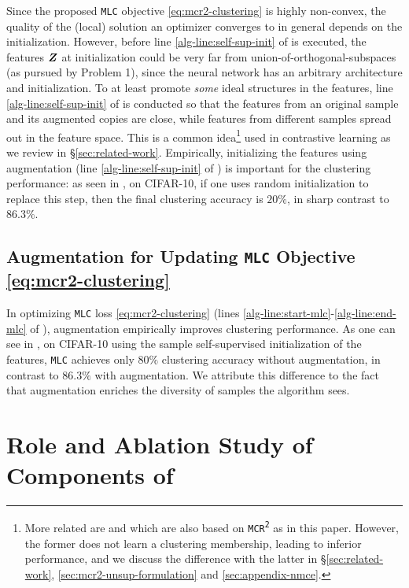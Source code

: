 \documentclass[10pt,twocolumn,letterpaper]{article}
\newcommand{\ours}{MLC}
\newcommand{\mours}{\texttt{\ours}}
\newcommand{\mcr}{\texttt{MCR\textsuperscript{2}}}
\begin{document}
   Since the proposed \mours{} objective \eqref{eq:mcr2-clustering} is highly non-convex, the quality of the (local) solution an optimizer converges to in general depends on the initialization. However, before line \ref{alg-line:self-sup-init} of  is executed, the features ${\bm{Z}}$ at initialization could be very far from union-of-orthogonal-subspaces (as pursued by Problem 1), since the neural network has an arbitrary architecture and initialization. To at least promote \textit{some} ideal structures in the features, line \ref{alg-line:self-sup-init} of  is conducted so that the features from an original sample and its augmented copies are close, while features from different samples spread out in the feature space. This is a common idea\footnote{More related are \cite[\S 3.2]{Yu2020-mx} and \cite[\S 3.6]{Li2022-vq} which are also based on \mcr{} as in this paper. However, the former does not learn a clustering membership, leading to inferior performance, and we discuss the difference with the latter in \S \ref{sec:related-work}, \ref{sec:mcr2-unsup-formulation} and \ref{sec:appendix-nmce}. } used in contrastive learning as we review in \S \ref{sec:related-work}.  Empirically, initializing the features using augmentation (line \ref{alg-line:self-sup-init} of ) is important for the clustering performance: as seen in , on CIFAR-10, if one uses random initialization to replace this step, then the final clustering accuracy is $20\%$, in sharp contrast to $86.3\%$.
   
   \subsection{Augmentation for Updating \bf{\mours{}} Objective \eqref{eq:mcr2-clustering}}
   
   In optimizing \mours{} loss \eqref{eq:mcr2-clustering} (lines \ref{alg-line:start-mlc}-\ref{alg-line:end-mlc} of ), augmentation empirically improves clustering performance. As one can see in , on CIFAR-10 using the sample self-supervised initialization of the features, \mours{} achieves only $80\%$ clustering accuracy without augmentation, in contrast to $86.3\%$ with augmentation. We attribute this difference to the fact that augmentation enriches the diversity of samples the algorithm sees.
   
   \section{Role and Ablation Study of Components of }
   
\end{document}
